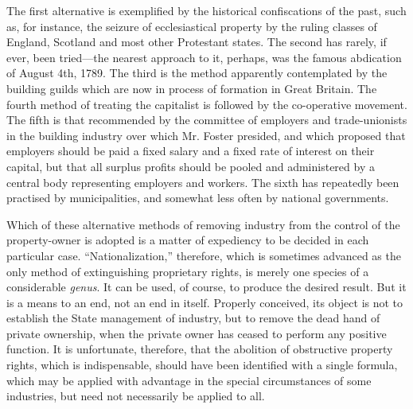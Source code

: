 \documentclass{book}
\begin{document}
The first alternative is exemplified by the historical confiscations of the past, such as, for instance, the seizure of ecclesiastical property by the ruling classes of England, Scotland and most other Protestant states. The second has rarely, if ever, been tried—the nearest approach to it, perhaps, was the famous abdication of August 4th, 1789. The third is the method apparently contemplated by the building guilds which are now in process of formation in Great Britain. The fourth method of treating the capitalist is followed by the co-operative movement. The fifth is that recommended by the committee of employers and trade-unionists in the building industry over which Mr. Foster presided, and which proposed that employers should be paid a fixed salary and a fixed rate of interest on their capital, but that all surplus profits should be pooled and administered by a central body representing employers and workers. The sixth has repeatedly been practised by municipalities, and somewhat less often by national governments.

Which of these alternative methods of removing industry from the control of the property-owner is adopted is a matter of expediency to be decided in each particular case. “Nationalization,” therefore, which is sometimes advanced as the only method of extinguishing proprietary rights, is merely one species of a considerable \emph{genus}. It can be used, of course, to produce the desired result. But it is a means to an end, not an end in itself. Properly conceived, its object is not to establish the State management of industry, but to remove the dead hand of private ownership, when the private owner has ceased to perform any positive function. It is unfortunate, therefore, that the abolition of obstructive property rights, which is indispensable, should have been identified with a single formula, which may be applied with advantage in the special circumstances of some industries, but need not necessarily be applied to all.
\end{document}
